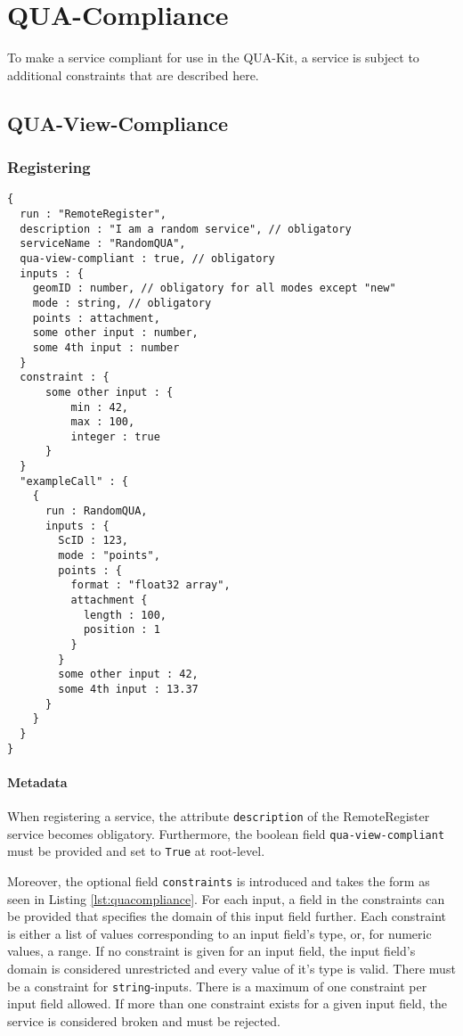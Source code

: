 \section{QUA-Compliance}
\label{ch:quacompliance}

To make a service compliant for use in the QUA-Kit, a service is subject to additional constraints that are described here.

\subsection{QUA-View-Compliance}

\subsubsection{Registering}

\begin{lstlisting}[caption={Registering a QUA-compliant service}, label={lst:quacompliance}]
{
  run : "RemoteRegister",
  description : "I am a random service", // obligatory
  serviceName : "RandomQUA",
  qua-view-compliant : true, // obligatory
  inputs : {
    geomID : number, // obligatory for all modes except "new"
    mode : string, // obligatory
    points : attachment,
    some other input : number,
    some 4th input : number
  }
  constraint : {
      some other input : {
          min : 42,
          max : 100,
          integer : true
      }
  }
  "exampleCall" : {
    {
      run : RandomQUA,
      inputs : {
        ScID : 123,
        mode : "points",
        points : {
          format : "float32 array",
          attachment {
            length : 100,
            position : 1
          }
        }
        some other input : 42,
        some 4th input : 13.37
      }
    }
  }
}
\end{lstlisting}

\paragraph{Metadata}
When registering a service, the attribute \texttt{description} of the RemoteRegister service becomes obligatory. Furthermore, the boolean field \texttt{qua-view-compliant} must be provided and set to \texttt{True} at root-level.

Moreover, the optional field \texttt{constraints} is introduced and takes the form as seen in Listing \ref{lst:quacompliance}.
For each input, a field in the constraints can be provided that specifies the domain of this input field further. Each constraint is either a list of values corresponding to an input field's type, or, for numeric values, a range. If no constraint is given for an input field, the input field's domain is considered unrestricted and every value of it's type is valid. There must be a constraint for \texttt{string}-inputs. There is a maximum of one constraint per input field allowed. If more than one constraint exists for a given input field, the service is considered broken and must be rejected.

